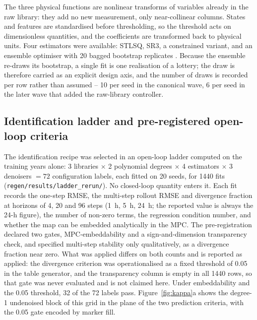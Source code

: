 The three physical functions are nonlinear transforms of variables already in the raw
library: they add no new measurement, only near-collinear columns. States and features
are standardised before thresholding, so the threshold acts on dimensionless quantities,
and the coefficients are transformed back to physical units. Four estimators were
available: STLSQ, SR3, a constrained variant, and an ensemble optimiser with 20 bagged
bootstrap replicates \cite{fasel2022}. Because the ensemble re-draws its bootstrap, a
single fit is one realisation of a lottery; the draw is therefore carried as an explicit
design axis, and the number of draws is recorded per row rather than assumed -- 10 per
seed in the canonical wave, 6 per seed in the later wave that added the raw-library
controller.

\subsection{Identification ladder and pre-registered open-loop criteria}
\label{sec:ladder}

The identification recipe was selected in an open-loop ladder computed on the training
years alone: 3 libraries $\times$ 2 polynomial degrees $\times$ 4 estimators $\times$
3 denoisers $=72$ configuration labels, each fitted on 20 seeds, for 1440 fits
(\texttt{regen/results/ladder\_rerun/}). No closed-loop quantity enters it. Each fit
records the one-step RMSE, the multi-step rollout RMSE and divergence fraction at
horizons of 4, 20 and 96 steps (1~h, 5~h, 24~h; the reported value is always the 24-h
figure), the number of non-zero terms, the regression condition number, and whether the
map can be embedded analytically in the MPC. The pre-registration declared two gates,
MPC-embeddability and a sign-and-dimension transparency check, and specified multi-step
stability only qualitatively, as a divergence fraction near zero. What was applied differs
on both counts and is reported as applied: the divergence criterion was operationalised as
a fixed threshold of 0.05 in the table generator, and the transparency column is empty in
all 1440 rows, so that gate was never evaluated and is not claimed here. Under
embeddability and the 0.05 threshold, 32 of the 72 labels pass.
Figure~\ref{fig:kappa}a shows the degree-1 undenoised block of this grid in the plane of
the two prediction criteria, with the 0.05 gate encoded by marker fill.

